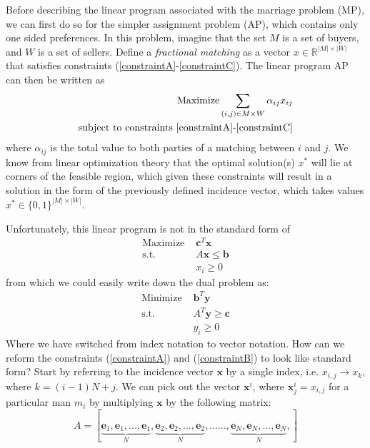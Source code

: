 \documentclass[twoside]{article}
\begin{document}
Before describing the linear program associated with the marriage problem (MP), we can first do so for the simpler assignment problem (AP), which contains only one sided preferences. In this problem, imagine that the set $M$ is a set of buyers, and $W$ is a set of sellers. Define a \textit{fractional matching} as a vector $x \in  \mathbb{R} ^{|M|\times |W|}$ that satisfies constraints (\ref{constraintA}-\ref{constraintC}). The linear program AP can then be written as 
\begin{align*}
\text{Maximize} \sum_{(i,j)\in M \times W} \alpha_{ij}x_{ij}\\
\text{subject to constraints \ref{constraintA}-\ref{constraintC}}
\end{align*}
where $\alpha_{ij}$ is the total value to both parties of a matching between $i$ and $j$. We know from linear optimization theory that the optimal solution(s) $x^*$ will lie at corners of the feasible region, which given these constraints will result in a solution in the form of the previously defined incidence vector, which takes values $x^* \in \lbrace 0, 1 \rbrace ^{|M|\times |W|}$. 

Unfortunately, this linear program is not in the standard form of \begin{align*}
    \text{Maximize } &\textbf{c}^{T}\textbf{x}\\
    \text{s.t. }&A\textbf{x} \leq \textbf{b}\\
    & x_i \geq 0
\end{align*}
from which we could easily write down the dual problem as:
\begin{align*}
    \text{Minimize } &\textbf{b}^{T}\textbf{y}\\
    \text{s.t. }&A^T\textbf{y} \geq \textbf{c}\\
    & y_i \geq 0
\end{align*}
Where we have switched from index notation to vector notation. How can we reform the constraints (\ref{constraintA}) and (\ref{constraintB}) to look like standard form? Start by referring to the incidence vector $\textbf{x}$ by a single index, i.e. $x_{i,j} \rightarrow x_k$, where $k = (i-1)N+j$. We can pick out the vector $\textbf{x}^{i}$, where $\textbf{x}^i_j = x_{i,j}$ for a particular man $m_i$ by multiplying $\textbf{x}$ by the following matrix:
\[
A = [\underbrace{\textbf{e}_1, \textbf{e}_1, ..., \textbf{e}_1}_N,\underbrace{\textbf{e}_2, \textbf{e}_2, ..., \textbf{e}_2}_N,......,\underbrace{\textbf{e}_N, \textbf{e}_N, ..., \textbf{e}_N}_N,]
\]
\end{document}
